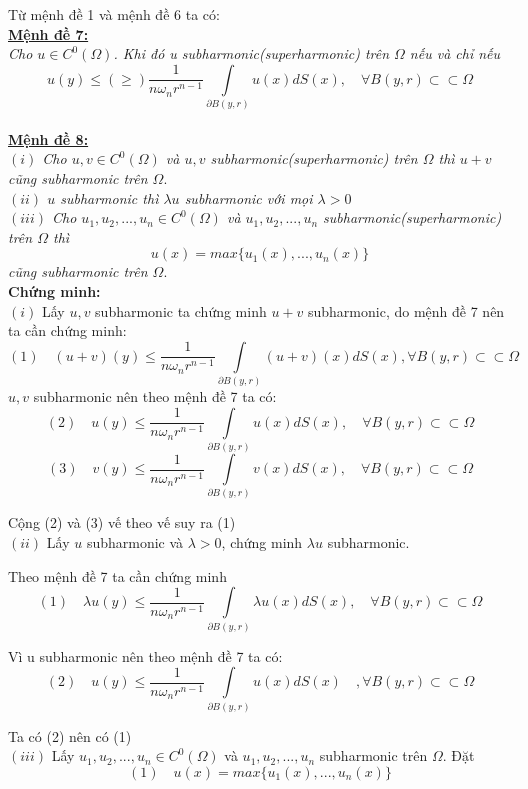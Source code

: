 Từ mệnh đề 1 và mệnh đề 6 ta có:
\\
{ \underline {\bf Mệnh đề 7:}} 
\\
{\it Cho $u \in C^0(\Omega)$.  Khi đó u subharmonic(superharmonic) trên $\Omega$ nếu và chỉ nếu 	
$$
u(y) \le ( \ge )\frac{1}{{n\omega _n r^{n - 1} }}\int\limits_{\partial B(y,r)} {u(x)dS(x)},\quad\forall B(y,r) \subset  \subset \Omega 
$$}
\\
{ \bf \underline {Mệnh đề 8:}}
\\
{\it
$(i)$ Cho $u,v \in C^0(\Omega)$ và $u,v$ subharmonic(superharmonic) trên $\Omega$ thì $u+v$ cũng subharmonic trên $\Omega.$ 	\\
$(ii)$ $u$ subharmonic thì $\lambda u$ subharmonic với mọi $\lambda >0$\\
$(iii)$ Cho $u_1,u_2,...,u_n \in C^0(\Omega)$  và  $u_1,u_2,...,u_n$ subharmonic(superharmonic)  trên $\Omega$ thì 
$$u(x)=max\{u_1(x),...,u_n(x)\}$$ cũng subharmonic trên $\Omega.$ }
\\
{\bf {Chứng minh:}}
\\
 $(i)$ Lấy $u,v$ subharmonic ta chứng minh $u+v$ subharmonic, do mệnh đề 7 nên ta cần chứng minh:
 $$
 (1)\quad(u+v)(y) \le\frac{1}{{n\omega _n r^{n - 1} }}\int\limits_{\partial B(y,r)} {(u+v)(x)dS(x)} ,\forall B(y,r) \subset  \subset \Omega 
$$
$u,v$ subharmonic nên theo mệnh đề 7 ta có: 
 $$
(2)\quad u(y) \le\frac{1}{{n\omega _n r^{n - 1} }}\int\limits_{\partial B(y,r)} {u(x)dS(x)},\quad\forall B(y,r) \subset  \subset \Omega 
$$
 $$
(3)\quad v(y) \le\frac{1}{{n\omega _n r^{n - 1} }}\int\limits_{\partial B(y,r)} {v(x)dS(x)} ,\quad\forall B(y,r) \subset  \subset \Omega 
$$

Cộng (2) và (3) vế theo vế suy ra (1)
\\
 $(ii)$ Lấy $u$ subharmonic và $\lambda>0$, chứng minh $\lambda u$ subharmonic.
 
 Theo mệnh đề 7 ta cần chứng minh 
 $$
(1)\quad \lambda u(y) \le\frac{1}{{n\omega _n r^{n - 1} }}\int\limits_{\partial B(y,r)} {\lambda u(x)dS(x)},\quad\forall B(y,r) \subset  \subset \Omega 
$$

Vì u subharmonic nên theo mệnh đề 7 ta có:
$$
(2)\quad u(y) \le\frac{1}{{n\omega _n r^{n - 1} }}\int\limits_{\partial B(y,r)} {u(x)dS(x)} \quad,\forall B(y,r) \subset  \subset \Omega 
$$

Ta có (2) nên có (1)
\\
$(iii)$ Lấy $u_1,u_2,...,u_n \in C^0(\Omega)$  và  $u_1,u_2,...,u_n$ subharmonic  trên $\Omega$. Đặt 
$$(1)\quad u(x)=max\{u_1(x),...,u_n(x)\}$$ 

